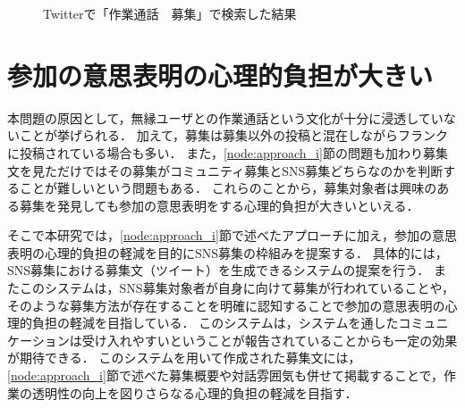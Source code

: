 \begin{figure}
    \centering
    \caption{Twitterで「作業通話　募集」で検索した結果}
    \label{fig:tweet_recruitment}
\end{figure}

\section{参加の意思表明の心理的負担が大きい}

本問題の原因として，無縁ユーザとの作業通話という文化が十分に浸透していないことが挙げられる．
加えて，募集は募集以外の投稿と混在しながらフランクに投稿されている場合も多い．
また，\ref{node:approach_i}節の問題も加わり募集文を見ただけではその募集がコミュニティ募集とSNS募集どちらなのかを判断することが難しいという問題もある．
これらのことから，募集対象者は興味のある募集を発見しても参加の意思表明をする心理的負担が大きいといえる．

そこで本研究では，\ref{node:approach_i}節で述べたアプローチに加え，参加の意思表明の心理的負担の軽減を目的にSNS募集の枠組みを提案する．
具体的には，SNS募集における募集文（ツイート）を生成できるシステムの提案を行う．
またこのシステムは，SNS募集対象者が自身に向けて募集が行われていることや，そのような募集方法が存在することを明確に認知することで参加の意思表明の心理的負担の軽減を目指している．
このシステムは，システムを通したコミュニケーションは受け入れやすいということが報告されていることからも一定の効果が期待できる\cite{Harada}\cite{Kimura}\cite{Nishimura}\cite{Tsuzuki}．
このシステムを用いて作成された募集文には，\ref{node:approach_i}節で述べた募集概要や対話雰囲気も併せて掲載することで，作業の透明性の向上を図りさらなる心理的負担の軽減を目指す．
